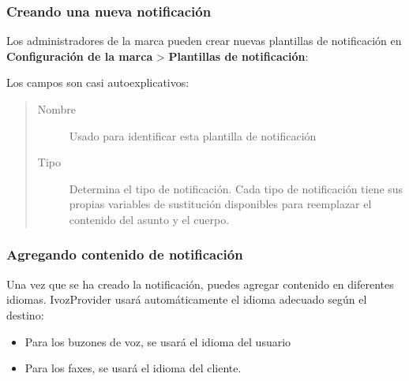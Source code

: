 \documentclass[letterpaper,10pt,spanish]{sphinxmanual}
\begin{document}
\subsubsection{Creando una nueva notificación}
\label{administration_portal/brand/settings/notification_templates:creating-a-new-notification}
Los administradores de la marca pueden crear nuevas plantillas de notificación en \textbf{Configuración de la marca} \textgreater{} \textbf{Plantillas de notificación}:

Los campos son casi autoexplicativos:
\begin{quote}
\begin{description}
\item[{Nombre}] \leavevmode
Usado para identificar esta plantilla de notificación

\item[{Tipo}] \leavevmode
Determina el tipo de notificación. Cada tipo de notificación tiene sus propias variables de sustitución disponibles para reemplazar el contenido del asunto y el cuerpo.

\end{description}
\end{quote}


\subsubsection{Agregando contenido de notificación}
\label{administration_portal/brand/settings/notification_templates:adding-notification-contents}
Una vez que se ha creado la notificación, puedes agregar contenido en diferentes idiomas. IvozProvider usará automáticamente el idioma adecuado según el destino:
\begin{itemize}
\item {} 
Para los buzones de voz, se usará el idioma del usuario

\item {} 
Para los faxes, se usará el idioma del cliente.

\end{itemize}
\end{document}
